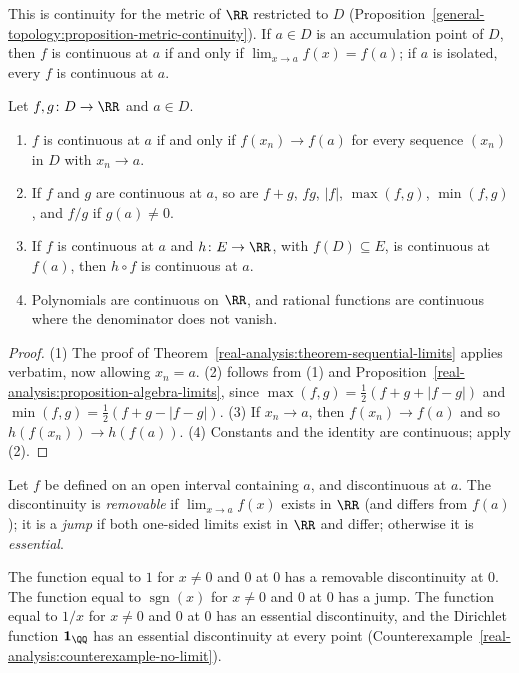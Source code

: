 This is continuity for the metric of $\RR$ restricted to $D$ (Proposition~\ref{general-topology:proposition-metric-continuity}). If $a \in D$ is an accumulation point of $D$, then $f$ is continuous at $a$ if and
only if $\lim_{x \to a}f(x) = f(a)$; if $a$ is isolated, every $f$ is continuous at $a$.

\begin{proposition}\label{real-analysis:proposition-continuity-sequential}
Let $f, g \colon D \to \RR$ and $a \in D$.
\begin{enumerate}
\item $f$ is continuous at $a$ if and only if $f(x_n) \to f(a)$ for every sequence $(x_n)$ in $D$ with $x_n \to a$.
\item If $f$ and $g$ are continuous at $a$, so are $f + g$, $fg$, $|f|$, $\max(f, g)$, $\min(f, g)$, and $f/g$ if $g(a) \neq 0$.
\item If $f$ is continuous at $a$ and $h \colon E \to \RR$, with $f(D) \subseteq E$, is continuous at $f(a)$, then $h \circ f$ is continuous at $a$.
\item Polynomials are continuous on $\RR$, and rational functions are continuous where the denominator does not vanish.
\end{enumerate}
\end{proposition}

\begin{proof}
(1) The proof of Theorem~\ref{real-analysis:theorem-sequential-limits} applies verbatim, now allowing $x_n = a$. (2) follows from (1) and Proposition~\ref{real-analysis:proposition-algebra-limits}, since
$\max(f, g) = \frac12(f + g + |f - g|)$ and $\min(f, g) = \frac12(f + g - |f - g|)$. (3) If $x_n \to a$, then $f(x_n) \to f(a)$ and so $h(f(x_n)) \to h(f(a))$. (4) Constants and the identity are continuous;
apply (2).
\end{proof}

\begin{definition}\label{real-analysis:definition-discontinuities}
Let $f$ be defined on an open interval containing $a$, and discontinuous at $a$. The discontinuity is \emph{removable} if $\lim_{x \to a}f(x)$ exists in $\RR$ (and differs from $f(a)$); it is a \emph{jump} if both
one-sided limits exist in $\RR$ and differ; otherwise it is \emph{essential}.
\end{definition}

\begin{example}\label{real-analysis:example-discontinuities}
The function equal to $1$ for $x \neq 0$ and $0$ at $0$ has a removable discontinuity at $0$. The function equal to $\operatorname{sgn}(x)$ for $x \neq 0$ and $0$ at $0$ has a jump. The function equal to $1/x$ for
$x \neq 0$ and $0$ at $0$ has an essential discontinuity, and the Dirichlet function $\mathbf{1}_\QQ$ has an essential discontinuity at every point (Counterexample~\ref{real-analysis:counterexample-no-limit}).
\end{example}

